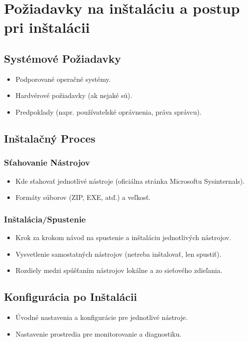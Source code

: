 \documentclass[conference]{IEEEtran}
\begin{document}
\section{Požiadavky na inštaláciu a postup pri inštalácii}
\subsection{Systémové Požiadavky}
\begin{itemize}
    \item Podporované operačné systémy.
    \item Hardvérové požiadavky (ak nejaké sú).
    \item Predpoklady (napr. používateľské oprávnenia, práva správcu).
\end{itemize}

\subsection{Inštalačný Proces}
\subsubsection{Sťahovanie Nástrojov}
\begin{itemize}
    \item Kde sťahovať jednotlivé nástroje (oficiálna stránka Microsoftu Sysinternals).
    \item Formáty súborov (ZIP, EXE, atď.) a veľkosť.
\end{itemize}

\subsubsection{Inštalácia/Spustenie}
\begin{itemize}
    \item Krok za krokom návod na spustenie a inštaláciu jednotlivých nástrojov.
    \item Vysvetlenie samostatných nástrojov (netreba inštalovať, len spustiť).
    \item Rozdiely medzi spúšťaním nástrojov lokálne a zo sieťového zdieľania.
\end{itemize}

\subsection{Konfigurácia po Inštalácii}
\begin{itemize}
    \item Úvodné nastavenia a konfigurácie pre jednotlivé nástroje.
    \item Nastavenie prostredia pre monitorovanie a diagnostiku.
\end{itemize}
\end{document}
